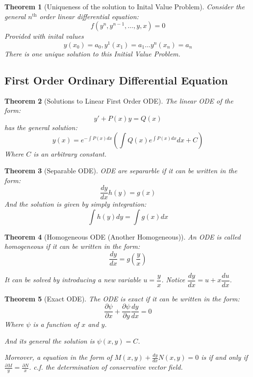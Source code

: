 \documentclass[12pt,a4paper]{article}
\newtheorem{theorem}{Theorem}[subsection]
\theoremstyle{definition}
\theoremstyle{remark}
\begin{document}
\begin{theorem}[Uniqueness of the solution to Inital Value Problem]\label{UniquenessTheorem}
Consider the general $n^{\text{th}}$ order linear differential equation:
\[
f(y^{n}, y^{n-1}, \dots, y, x) = 0 
\]
Provided with inital values 
$$y (x_0) = a_0, y^{1}(x_1) = a_1 \dots y^{n}(x_n) = a_n $$
There is one unique solution to this Initial Value Problem.

\end{theorem}


\subsection{First Order Ordinary Differential Equation}
\begin{theorem}[Solutions to Linear First Order ODE]
The linear ODE of the form:
\[
	y' + P(x)y = Q(x)
\]
has the general solution:
\[
	y(x) = e^{-\int P(x) dx}\left( \int Q(x) e^{\int P(x) dx} dx + C\right)
\]
Where $C$ is an arbitrary constant.

\end{theorem}

\begin{theorem}[Separable ODE]
	ODE are separarble if it can be written in the form:
\[
	\frac{dy}{dx} h(y) = g(x)
\]
And the solution is given by simply integration:
\[
	\int h(y) dy = \int g(x) dx
\]
\end{theorem}

\begin{theorem}[Homogeneous ODE (Another Homogeneous)]
An ODE is called homogeneous if it can be written in the form:
\[
	\frac{dy}{dx}  = g(\frac{y}{x})
\]

It can be solved by introducing a new variable $u = \dfrac{y}{x}$. Notice 
$ \dfrac{dy}{dx} = u + x \dfrac{du}{dx}$.
	
\end{theorem}

\begin{theorem}[Exact ODE]
	The ODE is exact if it can be written in the form:
\[
	\frac{ \partial \psi}{ \partial x} + \frac{ \partial \psi}{ \partial y} \frac{dy}{dx} = 0
\]
Where $\psi$ is a function of $x$ and $y$.

And its general the solution is $ \psi (x,y) = C$.

Moreover, a equation in the form of $ M(x,y) + \frac{dy}{dx} N(x,y) = 0$ is if and only if $ \frac{ \partial M}{y} = \frac{ \partial N}{x}.$
c.f. the determination of conservative vector field.
\end{theorem}
\end{document}
